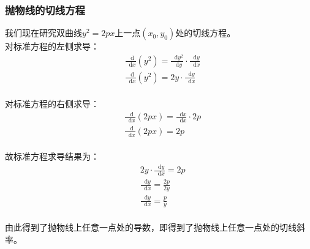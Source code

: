 \documentclass[UTF8]{ctexart}
\newcommand*{\dif}{\mathop{}\!\mathrm{d}}
\begin{document}
\newpage

\subsubsection{抛物线的切线方程}
    我们现在研究双曲线$y^2=2px$上一点$(x_0,y_0)$处的切线方程。\\[5mm]
    对标准方程的左侧求导：
    \setcounter{equation}{0}
    \begin{align}
        &\frac{\dif}{\dif x}\left(y^2\right)=\frac{\dif y^2}{\dif y}\cdot\frac{\dif y}{\dif x}\\[6mm]
        &\frac{\dif}{\dif x}\left(y^2\right)=2y\cdot\frac{\dif y}{\dif x}
    \end{align}\\
    对标准方程的右侧求导：
    \begin{align}
        &\frac{\dif}{\dif x}\left(2px\right)=\frac{\dif x}{\dif x}\cdot 2p\\[6mm]
        &\frac{\dif}{\dif x}\left(2px\right)=2p
    \end{align}\\
    故标准方程求导结果为：
    \begin{align}
        &2y\cdot\frac{\dif y}{\dif x}=2p\\[6mm]
        &\frac{\dif y}{\dif x}=\frac{2p}{2y}\\[6mm]
        &\frac{\dif y}{\dif x}=\frac{p}{y}
    \end{align}\\
    由此得到了抛物线上任意一点处的导数，即得到了抛物线上任意一点处的切线斜率。

\newpage
\end{document}
